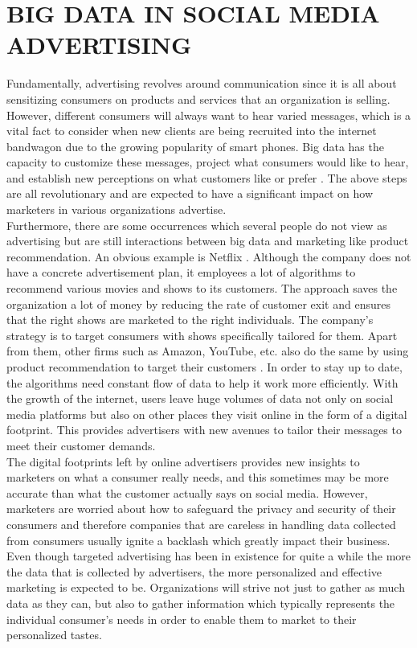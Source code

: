 \documentclass[sigconf]{acmart}
\begin{document}
\section{BIG DATA IN SOCIAL MEDIA ADVERTISING}

Fundamentally, advertising revolves around communication since it is all about sensitizing consumers on products and services that an organization is selling. However, different consumers will always want to hear varied messages, which is a vital fact to consider when new clients are being recruited into the internet bandwagon due to the growing popularity of smart phones. Big data has the capacity to customize these messages, project what consumers would like to hear, and establish new perceptions on what customers like or prefer \cite{Hensel&Deis2010}. The above steps are all revolutionary and are expected to have a significant impact on how marketers in various organizations advertise.  \\
Furthermore, there are some occurrences which several people do not view as advertising but are still interactions between big data and marketing like product recommendation. An obvious example is Netflix \cite{Eastwood2017}. Although the company does not have a concrete advertisement plan, it employees a lot of algorithms to recommend various movies and shows to its customers. The approach saves the organization a lot of money by reducing the rate of customer exit and ensures that the right shows are marketed to the right individuals. The company’s strategy is to target consumers with shows specifically tailored for them. Apart from them, other firms such as Amazon, YouTube, etc. also do the same by using product recommendation to target their customers  \cite{Eastwood2017}. In order to stay up to date, the algorithms need constant flow of data to help it work more efficiently. With the growth of the internet, users leave huge volumes of data not only on social media platforms but also on other places they visit online in the form of a digital footprint.  This provides advertisers with new avenues to tailor their messages to meet their customer demands. \\
The digital footprints left by online advertisers provides new insights to marketers on what a consumer really needs, and this sometimes may be more accurate than what the customer actually says on social media. However, marketers are worried about how to safeguard the privacy and security of their consumers and therefore companies that are careless in handling data collected from consumers usually ignite a backlash which greatly impact their business. Even though targeted advertising has been in existence for quite a while \cite{Eastwood2017} the more the data that is collected by advertisers, the more personalized and effective marketing is expected to be. Organizations will strive not just to gather as much data as they can, but also to gather information which typically represents the individual consumer’s needs in order to enable them to market to their personalized tastes.
\end{document}
